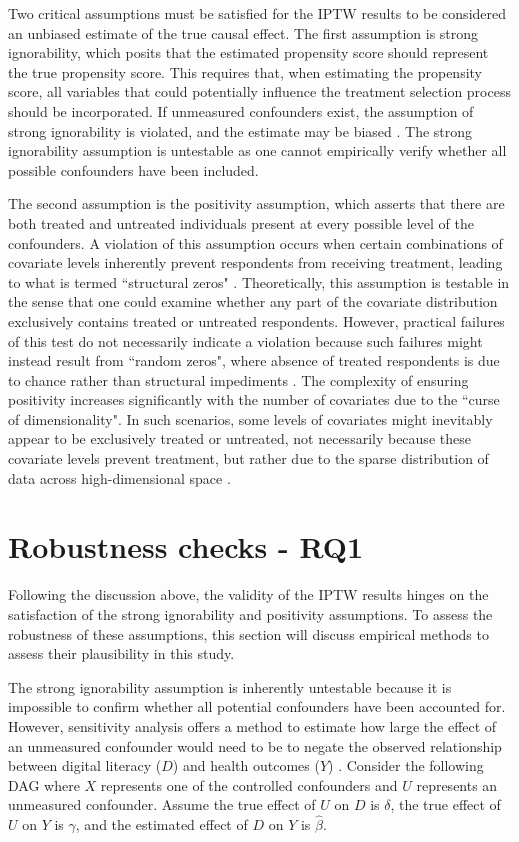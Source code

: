 Two critical assumptions must be satisfied for the IPTW results to be considered an unbiased estimate of the true causal effect. The first assumption is strong ignorability, which posits that the estimated propensity score should represent the true propensity score. This requires that, when estimating the propensity score, all variables that could potentially influence the treatment selection process should be incorporated. If unmeasured confounders exist, the assumption of strong ignorability is violated, and the estimate may be biased \parencite{cole_constructing_2008}. The strong ignorability assumption is untestable as one cannot empirically verify whether all possible confounders have been included. 

The second assumption is the positivity assumption, which asserts that there are both treated and untreated individuals present at every possible level of the confounders. A violation of this assumption occurs when certain combinations of covariate levels inherently prevent respondents from receiving treatment, leading to what is termed ``structural zeros" \parencite{austin_moving_2015}. Theoretically, this assumption is testable in the sense that one could examine whether any part of the covariate distribution exclusively contains treated or untreated respondents. However, practical failures of this test do not necessarily indicate a violation because such failures might instead result from ``random zeros", where absence of treated respondents is due to chance rather than structural impediments \parencite{cole_constructing_2008}. The complexity of ensuring positivity increases significantly with the number of covariates due to the ``curse of dimensionality". In such scenarios, some levels of covariates might inevitably appear to be exclusively treated or untreated, not necessarily because these covariate levels prevent treatment, but rather due to the sparse distribution of data across high-dimensional space \parencite[p. 397]{morgan_counterfactuals_2014}.

\section{Robustness checks - RQ1}
Following the discussion above, the validity of the IPTW results hinges on the satisfaction of the strong ignorability and positivity assumptions. To assess the robustness of these assumptions, this section will discuss empirical methods to assess their plausibility in this study.

The strong ignorability assumption is inherently untestable because it is impossible to confirm whether all potential confounders have been accounted for. However, sensitivity analysis offers a method to estimate how large the effect of an unmeasured confounder would need to be to negate the observed relationship between digital literacy ($D$) and health outcomes ($Y$) \parencite{shen_sensitivity_2011}. Consider the following DAG where $X$ represents one of the controlled confounders and $U$ represents an unmeasured confounder. Assume the true effect of $U$ on $D$ is $\delta$, the true effect of $U$ on $Y$ is $\gamma$, and the estimated effect of $D$ on $Y$ is $\hat{\beta}$.

